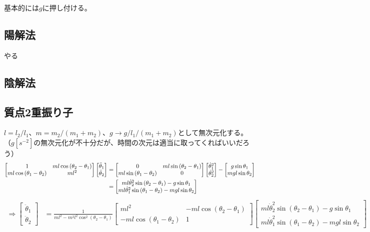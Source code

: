 \documentclass{jsarticle}
\newcommand{\eqa}[1]{\begin{align}#1\end{align}}
\newcommand{\so}{\Rightarrow}
\newcommand{\cost}[2]{\cos\left(\theta_{#1}-\theta_{#2}\right)}
\newcommand{\coste}[3]{\cos^{#3}\left(\theta_{#1}-\theta_{#2}\right)}
\newcommand{\sint}[2]{\sin\left(\theta_{#1}-\theta_{#2}\right)}
\newcommand{\dott}[1]{\dot{\theta}_{#1}}
\newcommand{\ddott}[1]{\ddot{\theta}_{#1}}
\begin{document}
基本的には$g$に押し付ける。

\subsection{陽解法}

やる

\subsection{陰解法}

\subsection{質点2重振り子}

$l = l_2 / l_1$、$m = m_2 / (m_1 + m_2)$、$g \rightarrow g / l_1 / (m_1 + m_2)$として無次元化する。
（$g[s^{-2}]$の無次元化が不十分だが、時間の次元は適当に取ってくればいいだろう）
\eqa{
	\begin{bmatrix}
		1 & m l \cost{2}{1} \\
		m l \cost{1}{2} & m l^2
	\end{bmatrix}
	\begin{bmatrix}
		\ddott{1} \\ \ddott{2}
	\end{bmatrix}
	&=
	\begin{bmatrix}
		0 & m l \sint{2}{1} \\
		m l \sint{1}{2} & 0
	\end{bmatrix}
	\begin{bmatrix}
		\dott{1}^2 \\ \dott{2}^2
	\end{bmatrix}
	-
	\begin{bmatrix}
		g \sin\theta_1 \\ m g l \sin\theta_2
	\end{bmatrix} \notag\\
	&=
	\begin{bmatrix}
		m l \dott{2}^2 \sint{2}{1} - g \sin\theta_1 \\
		m l \dott{1}^2 \sint{1}{2} - m g l \sin\theta_2
	\end{bmatrix} \notag
}
\eqa{
	\so
	\begin{bmatrix}
		\ddott{1} \\ \ddott{2}
	\end{bmatrix}
	&=
	\frac{1}{m l^2 - m^2 l^2 \coste{2}{1}{2}}
	\begin{bmatrix}
		m l^2 & -m l \cost{2}{1} \\
		-m l \cost{1}{2} & 1
	\end{bmatrix}
	\begin{bmatrix}
		m l \dott{2}^2 \sint{2}{1} - g \sin\theta_1 \\
		m l \dott{1}^2 \sint{1}{2} - m g l \sin\theta_2
	\end{bmatrix}
}
\end{document}
